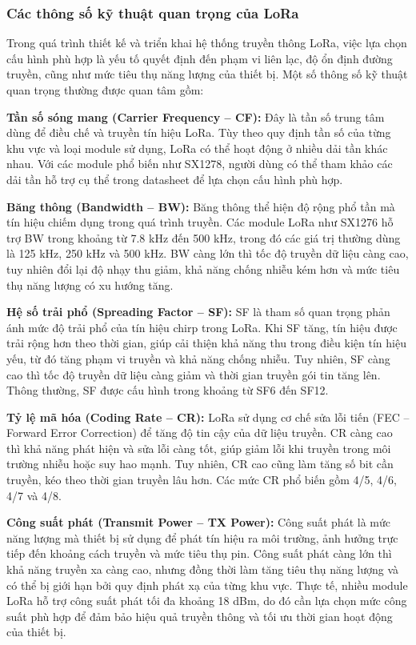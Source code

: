 \documentclass{article}
\begin{document}
	\subsubsection{Các thông số kỹ thuật quan trọng của LoRa}
	
	Trong quá trình thiết kế và triển khai hệ thống truyền thông LoRa, việc lựa chọn cấu hình phù hợp là yếu tố quyết định đến phạm vi liên lạc, độ ổn định đường truyền, cũng như mức tiêu thụ năng lượng của thiết bị. Một số thông số kỹ thuật quan trọng thường được quan tâm gồm:
	
	\textbf{Tần số sóng mang (Carrier Frequency – CF):} Đây là tần số trung tâm dùng để điều chế và truyền tín hiệu LoRa. Tùy theo quy định tần số của từng khu vực và loại module sử dụng, LoRa có thể hoạt động ở nhiều dải tần khác nhau. Với các module phổ biến như SX1278, người dùng có thể tham khảo các dải tần hỗ trợ cụ thể trong datasheet để lựa chọn cấu hình phù hợp.
	
	\textbf{Băng thông (Bandwidth – BW):} Băng thông thể hiện độ rộng phổ tần mà tín hiệu chiếm dụng trong quá trình truyền. Các module LoRa như SX1276 hỗ trợ BW trong khoảng từ 7.8 kHz đến 500 kHz, trong đó các giá trị thường dùng là 125 kHz, 250 kHz và 500 kHz. BW càng lớn thì tốc độ truyền dữ liệu càng cao, tuy nhiên đổi lại độ nhạy thu giảm, khả năng chống nhiễu kém hơn và mức tiêu thụ năng lượng có xu hướng tăng.
	
	\textbf{Hệ số trải phổ (Spreading Factor – SF):} SF là tham số quan trọng phản ánh mức độ trải phổ của tín hiệu chirp trong LoRa. Khi SF tăng, tín hiệu được trải rộng hơn theo thời gian, giúp cải thiện khả năng thu trong điều kiện tín hiệu yếu, từ đó tăng phạm vi truyền và khả năng chống nhiễu. Tuy nhiên, SF càng cao thì tốc độ truyền dữ liệu càng giảm và thời gian truyền gói tin tăng lên. Thông thường, SF được cấu hình trong khoảng từ SF6 đến SF12.
	
	\textbf{Tỷ lệ mã hóa (Coding Rate – CR):} LoRa sử dụng cơ chế sửa lỗi tiến (FEC – Forward Error Correction) để tăng độ tin cậy của dữ liệu truyền. CR càng cao thì khả năng phát hiện và sửa lỗi càng tốt, giúp giảm lỗi khi truyền trong môi trường nhiễu hoặc suy hao mạnh. Tuy nhiên, CR cao cũng làm tăng số bit cần truyền, kéo theo thời gian truyền lâu hơn. Các mức CR phổ biến gồm 4/5, 4/6, 4/7 và 4/8.
	
	\textbf{Công suất phát (Transmit Power – TX Power):} Công suất phát là mức năng lượng mà thiết bị sử dụng để phát tín hiệu ra môi trường, ảnh hưởng trực tiếp đến khoảng cách truyền và mức tiêu thụ pin. Công suất phát càng lớn thì khả năng truyền xa càng cao, nhưng đồng thời làm tăng tiêu thụ năng lượng và có thể bị giới hạn bởi quy định phát xạ của từng khu vực. Thực tế, nhiều module LoRa hỗ trợ công suất phát tối đa khoảng 18 dBm, do đó cần lựa chọn mức công suất phù hợp để đảm bảo hiệu quả truyền thông và tối ưu thời gian hoạt động của thiết bị.
	
\end{document}
